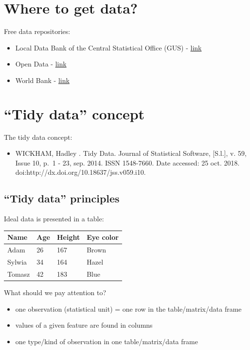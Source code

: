\documentclass[
  english,
  letterpaper,
  DIV=11,
  numbers=noendperiod]{scrreprt}
\newcounter{none} %
\providecommand{\tightlist}{%
  \setlength{\itemsep}{0pt}\setlength{\parskip}{0pt}}
\begin{document}
\section{Where to get data?}\label{where-to-get-data}

Free data repositories:

\begin{itemize}
\tightlist
\item
  Local Data Bank of the Central Statistical Office (GUS) -
  \href{https://bdl.stat.gov.pl/BDL/start}{link}
\item
  Open Data - \href{https://dane.gov.pl/}{link}
\item
  World Bank - \href{https://data.worldbank.org/}{link}
\end{itemize}

\section{``Tidy data'' concept}\label{tidy-data-concept}

The tidy data concept:

\begin{itemize}
\tightlist
\item
  WICKHAM, Hadley . Tidy Data. Journal of Statistical Software,
  {[}S.l.{]}, v. 59, Issue 10, p.~1 - 23, sep. 2014. ISSN 1548-7660.
  Date accessed: 25 oct. 2018.
  doi:http://dx.doi.org/10.18637/jss.v059.i10.
\end{itemize}

\subsection{``Tidy data'' principles}\label{tidy-data-principles}

Ideal data is presented in a table:

{\def\LTcaptype{none} %
\begin{longtable}[]{@{}llll@{}}
\toprule\noalign{}
Name & Age & Height & Eye color \\
\midrule\noalign{}
\endhead
\bottomrule\noalign{}
\endlastfoot
Adam & 26 & 167 & Brown \\
Sylwia & 34 & 164 & Hazel \\
Tomasz & 42 & 183 & Blue \\
\end{longtable}
}

What should we pay attention to?

\begin{itemize}
\tightlist
\item
  one observation (statistical unit) = one row in the table/matrix/data
  frame
\item
  values of a given feature are found in columns
\item
  one type/kind of observation in one table/matrix/data frame
\end{itemize}
\end{document}
